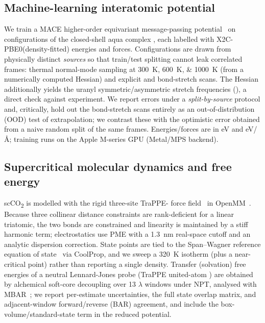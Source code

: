 \documentclass[journal=jcisd8,manuscript=article]{achemso}
\begin{document}
\subsection{Machine-learning interatomic potential}
We train a MACE higher-order equivariant message-passing
potential~\cite{Batatia2022} on \mlpNframes{} configurations of the closed-shell
aqua complex , each labelled with X2C-PBE0(density-fitted)
energies and forces. Configurations are drawn from physically distinct
\emph{sources} so that train/test splitting cannot leak correlated frames: thermal
normal-mode sampling at \SIlist{300;600;1000}{K} (from a numerically computed
Hessian) and explicit  and  bond-stretch scans. The Hessian
additionally yields the uranyl symmetric/asymmetric stretch frequencies
(\uostretch), a direct check against experiment. We report errors under a
\emph{split-by-source} protocol and, critically, hold out the bond-stretch scans
entirely as an out-of-distribution (OOD) test of extrapolation; we contrast these
with the optimistic error obtained from a naive random split of the same frames.
Energies/forces are in \si{eV} and \si{eV/\angstrom}; training runs on the Apple
M-series GPU (Metal/MPS backend).

\subsection{Supercritical  molecular dynamics and free energy}
scCO\textsubscript{2} is modelled with the rigid three-site TraPPE-
force field~\cite{Potoff2001} in OpenMM~\cite{openmm}. Because three collinear
distance constraints are rank-deficient for a linear triatomic, the two 
bonds are constrained and linearity is maintained by a stiff harmonic 
term; electrostatics use PME with a \SI{1.3}{nm} real-space cutoff and an
analytic dispersion correction. State points are tied to the Span--Wagner reference
equation of state~\cite{SpanWagner} via CoolProp, and we sweep a 320~K isotherm
(plus a near-critical point) rather than reporting a single density. Transfer
(solvation) free energies of a neutral Lennard-Jones probe (TraPPE united-atom
) are obtained by alchemical soft-core decoupling over 13 \(\lambda\)
windows under NPT, analysed with MBAR~\cite{ShirtsChodera}; we report per-estimate
uncertainties, the full state overlap matrix, and adjacent-window forward/reverse
(BAR) agreement, and include the box-volume/standard-state term in the reduced
potential.
\end{document}
